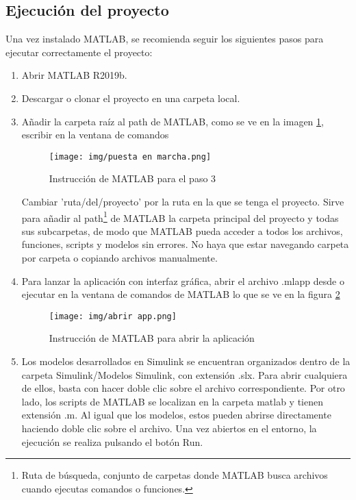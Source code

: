 \subsection{Ejecución del proyecto}
Una vez instalado MATLAB, se recomienda seguir los siguientes pasos para ejecutar correctamente el proyecto:
\begin{enumerate}
    \item Abrir MATLAB R2019b.
    \item Descargar o clonar el proyecto en una carpeta local.
    \item Añadir la carpeta raíz al path de MATLAB, como se ve en la imagen \ref{fig:instruccion}, escribir en la ventana de comandos
    \begin{figure}[H]
        \centering
        \texttt{[image: img/puesta en marcha.png]}
        \caption{Instrucción de MATLAB para el paso 3}
        \label{fig:instruccion}
        \vspace{0.5cm} %
    \end{figure}
    Cambiar 'ruta/del/proyecto' por la ruta en la que se tenga el proyecto.
    Sirve para añadir al path\footnote{Ruta de búsqueda, conjunto de carpetas donde MATLAB busca archivos cuando ejecutas comandos o funciones.} de MATLAB la carpeta principal del proyecto y todas sus subcarpetas, de modo que MATLAB pueda acceder a todos los archivos, funciones, scripts y modelos sin errores. No haya que estar navegando carpeta por carpeta o copiando archivos manualmente.
    \item Para lanzar la aplicación con interfaz gráfica, abrir el archivo .mlapp desde o ejecutar en la ventana de comandos de MATLAB lo que se ve en la figura \ref{fig:app abrir}
    \begin{figure}[H]
        \centering
        \texttt{[image: img/abrir app.png]}
        \caption{Instrucción de MATLAB para abrir la aplicación}
        \label{fig:app abrir}
        \vspace{0.5cm} %
    \end{figure}
    \item Los modelos desarrollados en Simulink se encuentran organizados dentro de la carpeta Simulink/Modelos Simulink, con extensión .slx. Para abrir cualquiera de ellos, basta con hacer doble clic sobre el archivo correspondiente.
    Por otro lado, los scripts de MATLAB se localizan en la carpeta matlab y tienen extensión .m. Al igual que los modelos, estos pueden abrirse directamente haciendo doble clic sobre el archivo. 
    Una vez abiertos en el entorno, la ejecución se realiza pulsando el botón Run.
    
\end{enumerate}



